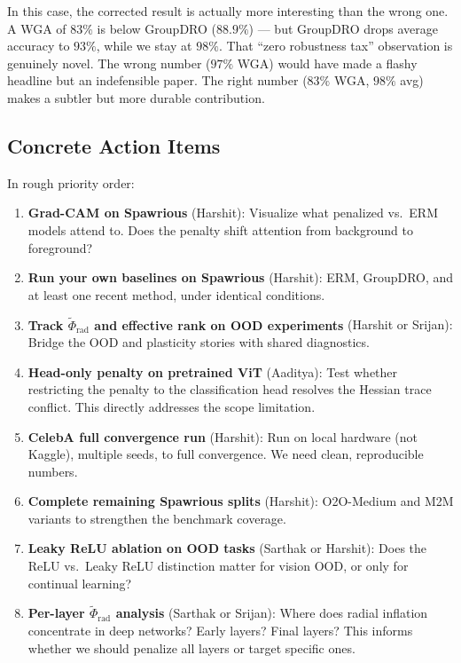 \documentclass[11pt,a4paper]{article}
\begin{document}
In this case, the corrected result is actually more interesting than the wrong one. A WGA of $83\%$ is below GroupDRO ($88.9\%$) --- but GroupDRO drops average accuracy to $93\%$, while we stay at $98\%$. That ``zero robustness tax'' observation is genuinely novel. The wrong number ($97\%$ WGA) would have made a flashy headline but an indefensible paper. The right number ($83\%$ WGA, $98\%$ avg) makes a subtler but more durable contribution.

\subsection{Concrete Action Items}

In rough priority order:

\begin{enumerate}
    \item \textbf{Grad-CAM on Spawrious} (Harshit): Visualize what penalized vs.\ ERM models attend to. Does the penalty shift attention from background to foreground?

    \item \textbf{Run your own baselines on Spawrious} (Harshit): ERM, GroupDRO, and at least one recent method, under identical conditions.

    \item \textbf{Track $\tilde{\Phi}_{\text{rad}}$ and effective rank on OOD experiments} (Harshit or Srijan): Bridge the OOD and plasticity stories with shared diagnostics.

    \item \textbf{Head-only penalty on pretrained ViT} (Aaditya): Test whether restricting the penalty to the classification head resolves the Hessian trace conflict. This directly addresses the scope limitation.

    \item \textbf{CelebA full convergence run} (Harshit): Run on local hardware (not Kaggle), multiple seeds, to full convergence. We need clean, reproducible numbers.

    \item \textbf{Complete remaining Spawrious splits} (Harshit): O2O-Medium and M2M variants to strengthen the benchmark coverage.

    \item \textbf{Leaky ReLU ablation on OOD tasks} (Sarthak or Harshit): Does the ReLU vs.\ Leaky ReLU distinction matter for vision OOD, or only for continual learning?

    \item \textbf{Per-layer $\tilde{\Phi}_{\text{rad}}$ analysis} (Sarthak or Srijan): Where does radial inflation concentrate in deep networks? Early layers? Final layers? This informs whether we should penalize all layers or target specific ones.
\end{enumerate}
\end{document}
